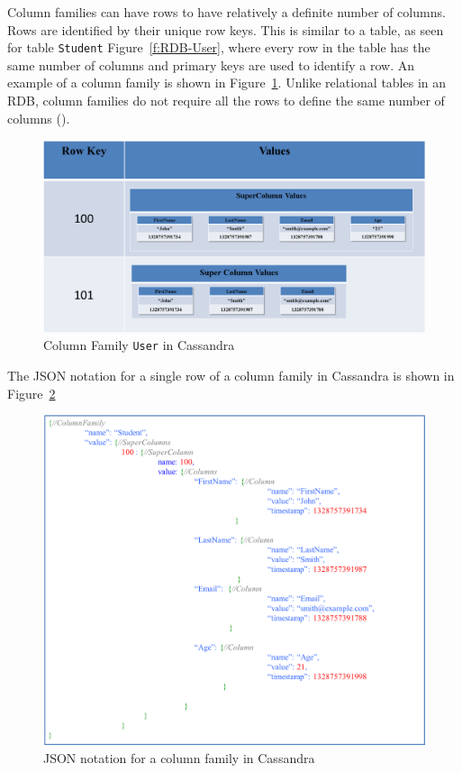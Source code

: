 \begin{description}
Column families can have rows to have relatively a definite number of columns.
Rows are identified by their unique row keys. This is similar to a table, as
seen for table \texttt{Student} Figure~\ref{f:RDB-User}, where every row
in the table has the same number of columns and primary keys are used to identify a row. An example of a column family is shown in Figure~\ref{f:columnfamilyUSER}.
Unlike relational tables in an \ac{RDB}, column families do not require all the
rows to define the same number of columns ().

\begin{figure}[H]
	\centering
	\includegraphics[width=.8\textwidth]{./figure/Example/ColumnFamily-User-DiffColumns.png}
	\caption{Column Family \texttt{User} in Cassandra}\label{f:columnfamilyUSER}
\end{figure}

The JSON notation for a single row of a column family in Cassandra is
shown in Figure~\ref{f:columnfamilyJSON} 

\begin{figure}[H]
	\centering
	\includegraphics[width=.8\textwidth]{./figure/Example/JSON_ColumnFamily_1row.png}
	\caption{JSON notation for a column family in
	Cassandra}\label{f:columnfamilyJSON}
\end{figure}


\end{description}
